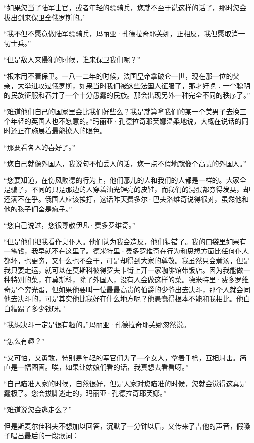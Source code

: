 \par “如果您当了陆军士官，或者年轻的骠骑兵，您就不至于说这样的话了，那时您会拔出剑来保卫全俄罗斯的。”
\par “我不但不愿意做陆军骠骑兵，玛丽亚·孔德拉奇耶芙娜，正相反，我但愿取消一切士兵。”
\par “但是敌人来侵犯的时候，谁来保卫我们呢？”
\par “根本用不着保卫。一八一二年的时候，法国皇帝拿破仑一世，现在那一位的父亲，大举进攻过俄罗斯，如果当时我们被这些法国人征服了，那才好呢：一个聪明的民族征服和吞并了一个十分愚蠢的民族。那会出现另外一种完全不同的秩序了。”
\par “难道他们自己的国家里会比我们好些么？我是就算拿我们的某一个美男子去换三个年轻的英国人也不愿意的。”玛丽亚·孔德拉奇耶芙娜温柔地说，大概在说话的同时还正在施展着最能撩人的眼色。
\par “那要看各人的喜好了。”
\par “您自己就像外国人，我说句不怕丢人的话，您一点不假地就像个高贵的外国人。”
\par “您要知道，在伤风败德的行为上，他们那儿的人和我们的人都是一样的。大家全是骗子，不同的只是那边的人穿着油光锃亮的皮鞋，而我们的混蛋都穷得发臭，却还满不在乎。俄国人应该挨打，这话昨天费多尔·巴夫洛维奇说得很对，虽然他和他的孩子们全是疯子。”
\par “您自己说过，您很尊敬伊凡·费多罗维奇。”
\par “但是他们把我看作臭仆人。他们认为我会造反，他们猜错了。我的口袋里如果有一笔钱，我早就不在这里了。德米特里·费多罗维奇在行为和思想方面比任何仆人都坏，也更穷，又什么也不会干，可是却得到大家的尊敬。我虽然只会煮汤，但是我只要走运，就可以在莫斯科彼得罗夫卡街上开一家咖啡馆带饭店。因为我能做一种特别的菜，在莫斯科，除了外国人，没有人会做这样的菜。德米特里·费多罗维奇是个穷光蛋，但如果他要叫一位最最高贵的伯爵的少爷出去决斗，那个人就会同他去决斗的，可是其实他比我好在什么地方呢？他愚蠢得根本不能和我相比。他白白糟蹋了多少钱呀。”
\par “我想决斗一定是很有趣的。”玛丽亚·孔德拉奇耶芙娜忽然说。
\par “怎么有趣？”
\par “又可怕，又勇敢，特别是年轻的军官们为了一个女人，拿着手枪，互相射击。简直是一幅图画。唉，如果让姑娘们看的话，我真想去看看呀。”
\par “自己瞄准人家的时候，自然很好，但是人家对您瞄准的时候，您就会觉得这真是蠢极了。您会拔脚逃走的，玛丽亚·孔德拉奇耶芙娜。”
\par “难道说您会逃走么？”
\par 但是斯麦尔佳科夫不想加以回答，沉默了一分钟以后，又传来了吉他的声音，假嗓子唱出最后的一段歌词：
